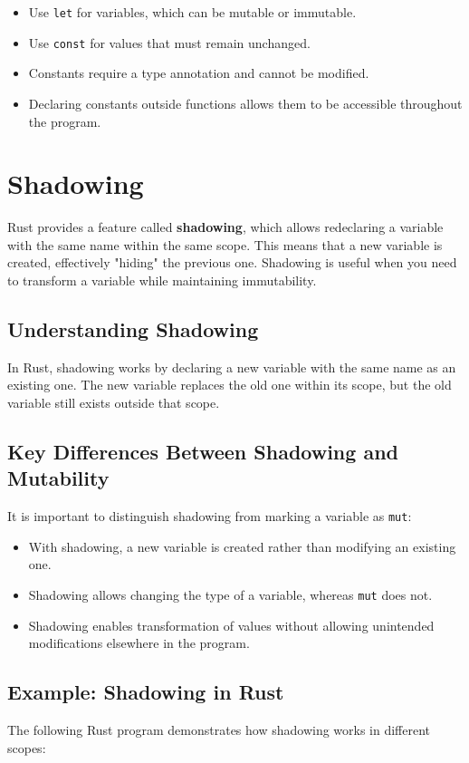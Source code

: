 \documentclass[a4paper,12pt]{report}
\begin{document}
\begin{takeawaybox}
		\begin{itemize}
		\item Use \texttt{let} for variables, which can be mutable or immutable.
		\item Use \texttt{const} for values that must remain unchanged.
		\item Constants require a type annotation and cannot be modified.
		\item Declaring constants outside functions allows them to be accessible throughout the program.
	\end{itemize}
\end{takeawaybox}

	\section{Shadowing}
	Rust provides a feature called \textbf{shadowing}, which allows redeclaring a variable with the same name within the same scope. This means that a new variable is created, effectively "hiding" the previous one. Shadowing is useful when you need to transform a variable while maintaining immutability.
	
	\subsection*{Understanding Shadowing}
	In Rust, shadowing works by declaring a new variable with the same name as an existing one. The new variable replaces the old one within its scope, but the old variable still exists outside that scope. 
	
	\subsection*{Key Differences Between Shadowing and Mutability}
	It is important to distinguish shadowing from marking a variable as \texttt{mut}:
	\begin{itemize}
		\item With shadowing, a new variable is created rather than modifying an existing one.
		\item Shadowing allows changing the type of a variable, whereas \texttt{mut} does not.
		\item Shadowing enables transformation of values without allowing unintended modifications elsewhere in the program.
	\end{itemize}
	
	\subsection*{Example: Shadowing in Rust}
	The following Rust program demonstrates how shadowing works in different scopes:
	
\end{document}
